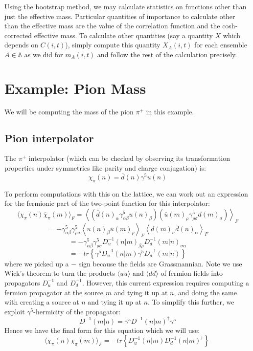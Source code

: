 \documentclass[11pt, oneside]{article}   	%
\theoremstyle{definition}
\begin{document}
Using the bootstrap method, we may calculate statistics on functions other than just the effective mass. Particular 
quantities of importance to calculate other than the effective mass are the value of the correlation function and the 
cosh-corrected effective mass. To calculate other quantities (say a quantity $X$ which depends on $C(i, t)$), simply 
compute this quantity $X_A(i, t)$ for each ensemble $A\in\mathbb A$ as we did for $m_A(i, t)$ and follow the rest of 
the calculation precisely. 

\newpage
\section{Example: Pion Mass}

We will be computing the mass of the pion $\pi^+$ in this example.

\subsection{Pion interpolator}

The $\pi^+$ interpolator (which can be checked by observing its transformation properties under symmetries like parity 
and charge conjugation) is:
\begin{equation}
	\chi_\pi(n) = \overline d(n)\gamma^5 u(n)
\end{equation}

To perform computations with this on the lattice, we can work out an expression for the fermionic part of the 
two-point function for this interpolator:
$$
	\langle\chi_\pi(n)\overline\chi_\pi(m)\rangle_F = \left\langle \left(\overline d(n)_\alpha \gamma^5_{\alpha\beta} 
	u(n)_\beta\right)\left(\overline u(m)_\rho\gamma^5_{\rho\sigma} d(m)_\sigma\right)\right\rangle_F
$$
$$
	= -\gamma^5_{\alpha\beta}\gamma^5_{\rho\sigma}\left\langle u(n)_\beta \overline u(m)_\rho\right\rangle_F
	\left\langle d(m)_\sigma\overline d(n)_\alpha\right\rangle_F
$$
$$
	= -\gamma_{\alpha\beta}^5\gamma_{\rho\sigma}^5 D^{-1}_u(n | m)_{\beta\rho} D^{-1}_d (m | n)_{\sigma\alpha}
$$
$$
	= -tr\left\{\gamma^5 D^{-1}_u (n | m) \gamma^5 D^{-1}_d (m | n)\right\}
$$
where we picked up a $-$ sign because the fields are Grassmannian. Note we use Wick's theorem to turn the products 
$\langle u \overline u\rangle$ and $\langle d\overline d\rangle$ of fermion fields into propagators $D^{-1}_u$ and 
$D^{-1}_d$. However, this current expression requires computing a fermion propagator at the source $m$ and tying 
it up at $n$, and doing the same with creating a source at $n$ and tying it up at $n$. To simplify this further, we 
exploit $\gamma^5$-hermicity of the propagator:
\begin{equation}
	D^{-1}(m | n) = \gamma^5 D^{-1}(n | m)^\dagger\gamma^5
\end{equation}
Hence we have the final form for this equation which we will use:
\begin{equation}
	\langle\chi_\pi(n)\overline\chi_\pi(m)\rangle_F = - tr\left\{D^{-1}_u (n | m) D^{-1}_d (n | m)^\dagger\right\}~
	\label{eq:correlator}
\end{equation}
\end{document}
